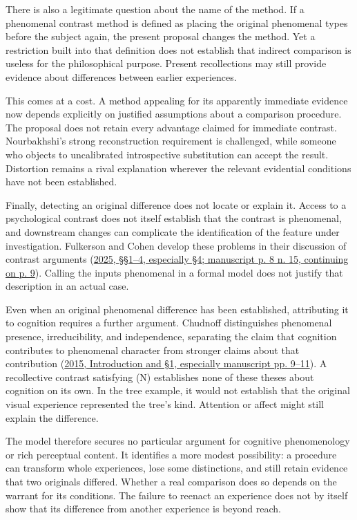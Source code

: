 There is also a legitimate question about the name of the method. If a phenomenal contrast method is defined as placing the original phenomenal types before the subject again, the present proposal changes the method. Yet a restriction built into that definition does not establish that indirect comparison is useless for the philosophical purpose. Present recollections may still provide evidence about differences between earlier experiences.

This comes at a cost. A method appealing for its apparently immediate evidence now depends explicitly on justified assumptions about a comparison procedure. The proposal does not retain every advantage claimed for immediate contrast. Nourbakhshi's strong reconstruction requirement is challenged, while someone who objects to uncalibrated introspective substitution can accept the result. Distortion remains a rival explanation wherever the relevant evidential conditions have not been established.

Finally, detecting an original difference does not locate or explain it. Access to a psychological contrast does not itself establish that the contrast is phenomenal, and downstream changes can complicate the identification of the feature under investigation. Fulkerson and Cohen develop these problems in their discussion of contrast arguments (\hyperlink{ref:fulkerson2025}{2025, §§1–4, especially §4; manuscript p. 8 n. 15, continuing on p. 9}). Calling the inputs phenomenal in a formal model does not justify that description in an actual case.

Even when an original phenomenal difference has been established, attributing it to cognition requires a further argument. Chudnoff distinguishes phenomenal presence, irreducibility, and independence, separating the claim that cognition contributes to phenomenal character from stronger claims about that contribution (\hyperlink{ref:chudnoff2015}{2015, Introduction and §1, especially manuscript pp. 9–11}). A recollective contrast satisfying (N) establishes none of these theses about cognition on its own. In the tree example, it would not establish that the original visual experience represented the tree's kind. Attention or affect might still explain the difference.

The model therefore secures no particular argument for cognitive phenomenology or rich perceptual content. It identifies a more modest possibility: a procedure can transform whole experiences, lose some distinctions, and still retain evidence that two originals differed. Whether a real comparison does so depends on the warrant for its conditions. The failure to reenact an experience does not by itself show that its difference from another experience is beyond reach.

